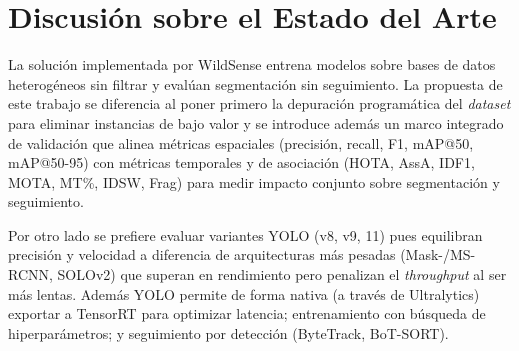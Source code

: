 \section{Discusión sobre el Estado del Arte}
La solución implementada por WildSense entrena modelos sobre bases de datos heterogéneos sin filtrar y evalúan segmentación sin seguimiento. La propuesta de este trabajo se diferencia al poner primero la depuración programática del \textit{dataset} para eliminar instancias de bajo valor y se introduce además un marco integrado de validación que alinea métricas espaciales (precisión, recall, F1, mAP@50, mAP@50-95) con métricas temporales y de asociación (HOTA, AssA, IDF1, MOTA, MT\%, IDSW, Frag) para medir impacto conjunto sobre segmentación y seguimiento.

Por otro lado se prefiere evaluar variantes YOLO (v8, v9, 11) pues equilibran precisión y velocidad a diferencia de arquitecturas más pesadas (Mask-/MS-RCNN, SOLOv2) que superan en rendimiento pero penalizan el \textit{throughput} al ser más lentas. Además YOLO permite de forma nativa (a través de Ultralytics) exportar a TensorRT para optimizar latencia; entrenamiento con búsqueda de hiperparámetros; y seguimiento por detección (ByteTrack, BoT-SORT).
